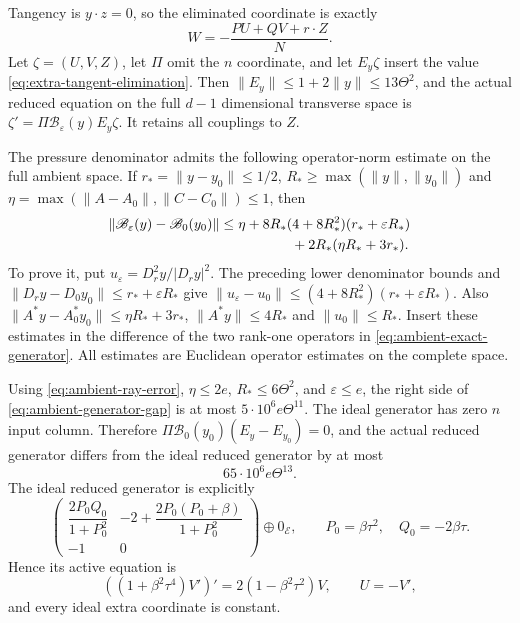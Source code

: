 \documentclass[11pt]{article}
\theoremstyle{definition}
\begin{document}
Tangency is $y\cdot z=0$, so the eliminated coordinate is exactly
\begin{equation}\label{eq:extra-tangent-elimination}
 W=-\frac{PU+QV+r\cdot Z}{N}.
\end{equation}
Let $\zeta=(U,V,Z)$, let $\Pi$ omit the $n$ coordinate, and let
$E_y\zeta$ insert the value \eqref{eq:extra-tangent-elimination}.
Then $\|E_y\|\leq1+2\|y\|\leq13\Theta^2$, and the actual reduced
equation on the full $d-1$ dimensional transverse space is
$\zeta'=\Pi\mathscr B_\varepsilon(y)E_y\zeta$.
It retains all couplings to $Z$.

The pressure denominator admits the following operator-norm estimate on
the full ambient space. If
$r_*=\|y-y_0\|\leq1/2$, $R_*\geq\max(\|y\|,\|y_0\|)$ and
$\eta=\max(\|A-A_0\|,\|C-C_0\|)\leq1$, then
\begin{align}
 \|\mathscr B_\varepsilon(y)-\mathscr B_0(y_0)\|
 &\leq \eta+
 8R_*(4+8R_*^2)(r_*+\varepsilon R_*)\nonumber\\
 &\hspace{18mm}+2R_*(\eta R_*+3r_*).              \label{eq:ambient-generator-gap}
\end{align}
To prove it, put $u_\varepsilon=D_r^2y/|D_ry|^2$.
The preceding lower denominator bounds and
$\|D_ry-D_0y_0\|\leq r_*+\varepsilon R_*$
give
$\|u_\varepsilon-u_0\|\leq
(4+8R_*^2)(r_*+\varepsilon R_*)$.
Also
$\|A^*y-A_0^*y_0\|\leq\eta R_*+3r_*$,
$\|A^*y\|\leq4R_*$ and $\|u_0\|\leq R_*$.
Insert these estimates in the difference of the two rank-one
operators in \eqref{eq:ambient-exact-generator}.
All estimates are Euclidean operator estimates on the complete space.

Using \eqref{eq:ambient-ray-error}, $\eta\leq2e$,
$R_*\leq6\Theta^2$, and $\varepsilon\leq e$, the right side of
\eqref{eq:ambient-generator-gap} is at most
$5\cdot10^6e\Theta^{11}$.
The ideal generator has zero $n$ input column.
Therefore
$\Pi\mathscr B_0(y_0)(E_y-E_{y_0})=0$, and the actual reduced generator
differs from the ideal reduced generator by at most
\begin{equation}\label{eq:ambient-reduced-gap}
 65\cdot10^6e\Theta^{13}.
\end{equation}
The ideal reduced generator is explicitly
\[
 \begin{pmatrix}
 \dfrac{2P_0Q_0}{1+P_0^2}&
       -2+\dfrac{2P_0(P_0+\beta)}{1+P_0^2}\\[2mm]
 -1&0
 \end{pmatrix}
 \oplus0_{\mathcal E},
 \qquad P_0=\beta\tau^2,\quad Q_0=-2\beta\tau .
\]
Hence its active equation is
\[
 ((1+\beta^2\tau^4)V')'=2(1-\beta^2\tau^2)V,\qquad U=-V',
\]
and every ideal extra coordinate is constant.
\end{document}
